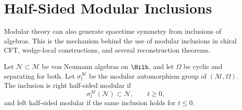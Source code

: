 \section{Half-Sided Modular Inclusions}
\label{sec:half-sided-modular-inclusions}

Modular theory can also generate spacetime symmetry from inclusions of
algebras.  This is the mechanism behind the use of modular inclusions in
chiral CFT, wedge-local constructions, and several reconstruction theorems.

\begin{definition}
\label{def:half-sided-modular-inclusion}
Let \(\mathcal N\subset\mathcal M\) be von Neumann algebras on \(\Hilb\), and
let \(\Omega\) be cyclic and separating for both.  Let
\(\sigma_t^{\mathcal M}\) be the modular automorphism group of
\((\mathcal M,\Omega)\).  The inclusion is right half-sided modular if
\[
  \sigma_t^{\mathcal M}(\mathcal N)\subset\mathcal N,
  \qquad t\ge0,
\]
and left half-sided modular if the same inclusion holds for \(t\le0\).
\end{definition}

